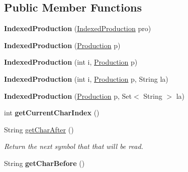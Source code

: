 \subsection*{Public Member Functions}
\begin{DoxyCompactItemize}
\item 
\hypertarget{classcontext_free_1_1scanner_1_1_indexed_production_ad5b9002f7ba3d98ecfc2e3dc7726dd43}{{\bfseries Indexed\-Production} (\hyperlink{classcontext_free_1_1scanner_1_1_indexed_production}{Indexed\-Production} pro)}\label{classcontext_free_1_1scanner_1_1_indexed_production_ad5b9002f7ba3d98ecfc2e3dc7726dd43}

\item 
\hypertarget{classcontext_free_1_1scanner_1_1_indexed_production_a97b000e2479c29af6618bfce987d83c6}{{\bfseries Indexed\-Production} (\hyperlink{classcontext_free_1_1grammar_1_1_production}{Production} p)}\label{classcontext_free_1_1scanner_1_1_indexed_production_a97b000e2479c29af6618bfce987d83c6}

\item 
\hypertarget{classcontext_free_1_1scanner_1_1_indexed_production_a6ca59cdc2f0b317c60878716bab91545}{{\bfseries Indexed\-Production} (int i, \hyperlink{classcontext_free_1_1grammar_1_1_production}{Production} p)}\label{classcontext_free_1_1scanner_1_1_indexed_production_a6ca59cdc2f0b317c60878716bab91545}

\item 
\hypertarget{classcontext_free_1_1scanner_1_1_indexed_production_aab947b1364a440092cde3a958aee9070}{{\bfseries Indexed\-Production} (int i, \hyperlink{classcontext_free_1_1grammar_1_1_production}{Production} p, String la)}\label{classcontext_free_1_1scanner_1_1_indexed_production_aab947b1364a440092cde3a958aee9070}

\item 
\hypertarget{classcontext_free_1_1scanner_1_1_indexed_production_a27402436a02bc8cd69f142e5ff1b6813}{{\bfseries Indexed\-Production} (\hyperlink{classcontext_free_1_1grammar_1_1_production}{Production} p, Set$<$ String $>$ la)}\label{classcontext_free_1_1scanner_1_1_indexed_production_a27402436a02bc8cd69f142e5ff1b6813}

\item 
\hypertarget{classcontext_free_1_1scanner_1_1_indexed_production_a85be6dd98b754adf00d101df181c3bb3}{int {\bfseries get\-Current\-Char\-Index} ()}\label{classcontext_free_1_1scanner_1_1_indexed_production_a85be6dd98b754adf00d101df181c3bb3}

\item 
String \hyperlink{classcontext_free_1_1scanner_1_1_indexed_production_a732f8fa87c6841cba382c88a6a6c30a5}{get\-Char\-After} ()
\begin{DoxyCompactList}\small\item\em Return the next symbol that that will be read. \end{DoxyCompactList}\item 
\hypertarget{classcontext_free_1_1scanner_1_1_indexed_production_a3607c538fe8b775bdd7641a252ebb0f7}{String {\bfseries get\-Char\-Before} ()}\label{classcontext_free_1_1scanner_1_1_indexed_production_a3607c538fe8b775bdd7641a252ebb0f7}


\end{DoxyCompactItemize}
